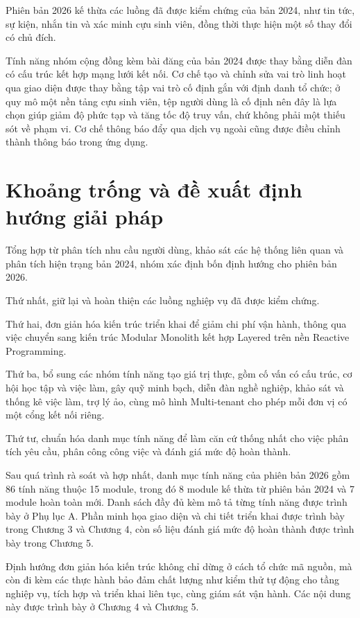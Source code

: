 \documentclass[12pt,a4paper,oneside]{report}
\begin{document}
Phiên bản 2026 kế thừa các luồng đã được kiểm chứng của bản 2024, như tin tức, sự kiện, nhắn tin và xác minh cựu sinh viên, đồng thời thực hiện một số thay đổi có chủ đích.

Tính năng nhóm cộng đồng kèm bài đăng của bản 2024 được thay bằng diễn đàn có cấu trúc kết hợp mạng lưới kết nối. Cơ chế tạo và chỉnh sửa vai trò linh hoạt qua giao diện được thay bằng tập vai trò cố định gắn với định danh tổ chức; ở quy mô một nền tảng cựu sinh viên, tệp người dùng là cố định nên đây là lựa chọn giúp giảm độ phức tạp và tăng tốc độ truy vấn, chứ không phải một thiếu sót về phạm vi. Cơ chế thông báo đẩy qua dịch vụ ngoài cũng được điều chỉnh thành thông báo trong ứng dụng.

\section{Khoảng trống và đề xuất định hướng giải pháp}

Tổng hợp từ phân tích nhu cầu người dùng, khảo sát các hệ thống liên quan và phân tích hiện trạng bản 2024, nhóm xác định bốn định hướng cho phiên bản 2026.

Thứ nhất, giữ lại và hoàn thiện các luồng nghiệp vụ đã được kiểm chứng.

Thứ hai, đơn giản hóa kiến trúc triển khai để giảm chi phí vận hành, thông qua việc chuyển sang kiến trúc Modular Monolith kết hợp Layered trên nền Reactive Programming.

Thứ ba, bổ sung các nhóm tính năng tạo giá trị thực, gồm cố vấn có cấu trúc, cơ hội học tập và việc làm, gây quỹ minh bạch, diễn đàn nghề nghiệp, khảo sát và thống kê việc làm, trợ lý ảo, cùng mô hình Multi-tenant cho phép mỗi đơn vị có một cổng kết nối riêng.

Thứ tư, chuẩn hóa danh mục tính năng để làm căn cứ thống nhất cho việc phân tích yêu cầu, phân công công việc và đánh giá mức độ hoàn thành.

Sau quá trình rà soát và hợp nhất, danh mục tính năng của phiên bản 2026 gồm 86 tính năng thuộc 15 module, trong đó 8 module kế thừa từ phiên bản 2024 và 7 module hoàn toàn mới. Danh sách đầy đủ kèm mô tả từng tính năng được trình bày ở Phụ lục A. Phần minh họa giao diện và chi tiết triển khai được trình bày trong Chương 3 và Chương 4, còn số liệu đánh giá mức độ hoàn thành được trình bày trong Chương 5.

Định hướng đơn giản hóa kiến trúc không chỉ dừng ở cách tổ chức mã nguồn, mà còn đi kèm các thực hành bảo đảm chất lượng như kiểm thử tự động cho tầng nghiệp vụ, tích hợp và triển khai liên tục, cùng giám sát vận hành. Các nội dung này được trình bày ở Chương 4 và Chương 5.
\end{document}
